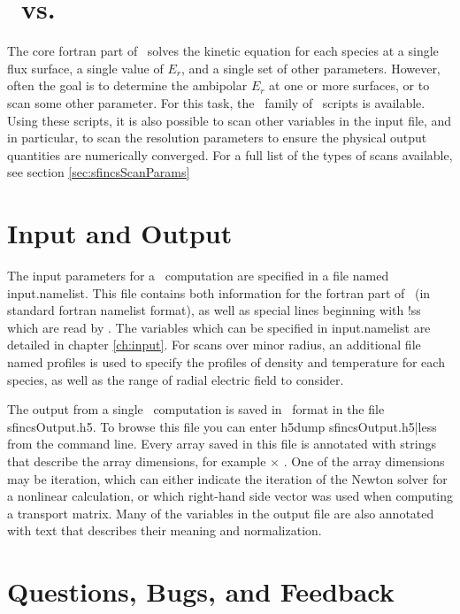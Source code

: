 \section{\sfincs~vs. \sfincsScan}
The core fortran part of \sfincs~solves the kinetic equation for each species
at a single flux surface, a single value of $E_r$, and a single set of other parameters.
However, often the goal is to determine the ambipolar $E_r$ at one or more surfaces, or to scan some other parameter.
For this task, the \sfincsScan~family of \python~scripts is available.
Using these scripts, it is also possible to scan other variables in the input file,
and in particular, to scan the resolution parameters to ensure
the physical output quantities are numerically converged.
For a full list of the types of scans available, see section \ref{sec:sfincsScanParams}

\section{Input and Output}

The input parameters for a \sfincs~computation are specified in a file named {\ttfamily input.namelist}.
This file contains both information for the fortran part of \sfincs~(in standard fortran namelist format),
as well as special lines beginning with {\ttfamily !ss} which are read by \sfincsScan.
The variables which can be specified in {\ttfamily input.namelist} are detailed in chapter \ref{ch:input}.
For scans over minor radius, an additional file named {\ttfamily profiles} is used to specify the profiles of density and temperature
for each species, as well as the range of radial electric field to consider.

The output from a single \sfincs~computation is saved in \HDF~format in the file {\ttfamily sfincsOutput.h5}.
To browse this file you can enter {\ttfamily h5dump sfincsOutput.h5|less} from the command line.
Every array saved in this file is annotated with strings that describe the array dimensions,
for example \Ntheta$\times$ \Nzeta. One of the array dimensions may be {\ttfamily iteration},
which can either indicate the iteration of the Newton solver for a nonlinear calculation,
or which right-hand side vector was used when computing a transport matrix.
Many of the variables in the output file are also annotated with
text that describes their meaning and normalization.

\section{Questions, Bugs, and Feedback}

